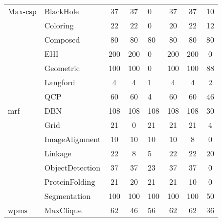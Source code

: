 \begin{table}
\begin{figcenter}
\begin{tabular}{xyccHccc}
Max-\acrshort{csp}	&	BlackHole	&	37	&	37	&	0	&	37	&	37	&	10 \\
				&	Coloring	&	22	&	22	&	0	&	20	&	22	&	12 \\
				&	Composed	&	80	&	80	&	80	&	80	&	80	&	80 \\
				&	EHI	&	200	&	200	&	0	&	200	&	200	&	0 \\
				&	Geometric	&	100	&	100	&	0	&	100	&	100	&	88 \\
				&	Langford	&	4	&	4	&	1	&	4	&	4	&	2 \\
				&	QCP	&	60	&	60	&	4	&	60	&	60	&	46 \\
\acrshort{mrf}	&	DBN	&	108	&	108	&	108	&	108	&	108	&	30 \\
				&	Grid	&	21	&	0	&	21	&	21	&	21	&	4 \\
				&	ImageAlignment	&	10	&	10	&	10	&	10	&	8	&	0 \\
				&	Linkage	&	22	&	8	&	5	&	22	&	22	&	20 \\
				&	ObjectDetection	&	37	&	37	&	23	&	37	&	37	&	0 \\
				&	ProteinFolding	&	21	&	20	&	21	&	21	&	10	&	0 \\
				&	Segmentation	&	100	&	100	&	100	&	100	&	100	&	50 \\
\acrshort{wpms}	&	MaxClique	&	62	&	46	&	56	&	62	&	62	&	36 \\
		\bottomrule
	\end{tabular}
	\end{figcenter}
\end{table}
